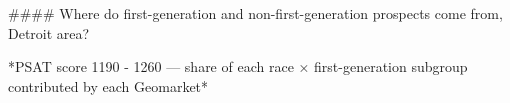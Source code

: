 #### Where do first-generation and non-first-generation prospects come from, Detroit area?

*PSAT score 1190 - 1260 — share of each race × first-generation subgroup contributed by each Geomarket*
